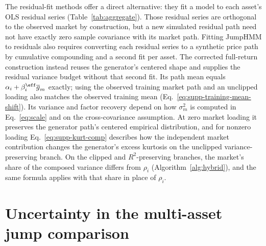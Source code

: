 The residual-fit methods offer a direct alternative: they fit a model
to each asset's OLS residual series (Table~\ref{tab:aggregate}). Those
residual series are orthogonal to the observed market by
construction, but a new simulated residual path need not have exactly
zero sample covariance with its market path. Fitting JumpHMM to
residuals also requires converting each residual series to a
synthetic price path by cumulative compounding and a second fit per
asset. The corrected full-return construction instead reuses the
generator's centered shape and supplies the residual variance budget
without that second fit. Its path mean equals
$\alpha_i+\beta_i^{\eff}\overline{g}_m$ exactly; using the observed training market path
and an unclipped loading also matches the observed training mean (Eq.~\eqref{eq:supp-training-mean-shift}).
Its variance and factor recovery depend on how $\sigma_m^2$ is
computed in Eq.~\eqref{eq:scale} and on the cross-covariance
assumption. At zero market loading it preserves the generator path's
centered empirical distribution, and for nonzero loading
Eq.~\eqref{eq:supp-kurt-comp} describes how the independent market
contribution changes the generator's excess kurtosis on the unclipped
variance-preserving branch. On the clipped and $R^2$-preserving
branches, the market's share of the composed variance differs from
$\rho_i$ (Algorithm~\ref{alg:hybrid}), and the same formula applies
with that share in place of $\rho_i$.

\begin{table}[H]
\centering
\caption{\textbf{Simulation check of the kurtosis composition rule.}
    For each variance share $\rho_i$, $200$ pairs of independent
    training-length paths from the fitted SPY hidden Markov model
    with jumps (HMM-WJ) were standardized and combined
    as $\sqrt{\rho_i}\, x + \sqrt{1 - \rho_i}\, y$. The predicted
    column evaluates Eq.~\eqref{eq:supp-kurt-comp} with each pair's
    sample excess kurtosis; the simulated column is the sample excess
    kurtosis of the combined series. Both are averaged over the $200$
    pairs.}
\label{tab:supp-kurt-composition}
\small

\end{table}


\section{Uncertainty in the multi-asset jump comparison}
\label{sec:supp-jump-composition}

